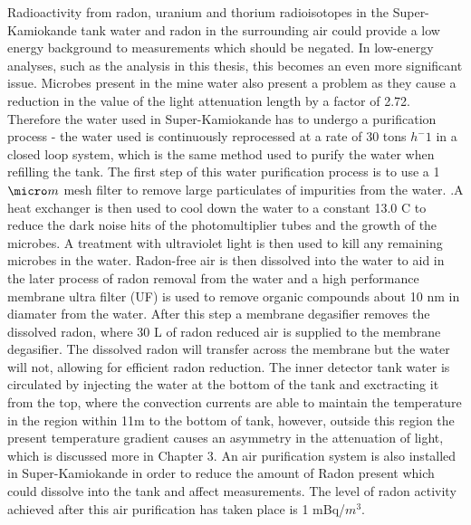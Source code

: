 Radioactivity from radon, uranium and thorium radioisotopes in the Super-Kamiokande tank water and radon in the surrounding air could provide a low energy background to measurements which should be negated. In low-energy analyses, such as the analysis in this thesis, this becomes an even more significant issue. Microbes present in the mine water also present a problem as they cause a reduction in the value of the light attenuation length by a factor of 2.72. Therefore the water used in Super-Kamiokande has to undergo a purification process - the water used is continuously reprocessed at a rate of 30 tons $h^-1$ in a closed loop system, which is the same method used to purify the water when refilling the tank. The first step of this water purification process is to use a 1$\micro m$ mesh filter to remove large particulates of impurities from the water. \cite{fernandezStatusGADZOOKSNeutron2016}.A heat exchanger is then used to cool down the water to a constant 13.0 \degree C to reduce the dark noise hits of the photomultiplier tubes and the growth of the microbes. A treatment with ultraviolet light is then used to kill any remaining microbes in the water. Radon-free air is then dissolved into the water to aid in the later process of radon removal from the water and a high performance membrane ultra filter (UF) is used to remove organic compounds about 10 nm in diamater from the water. After this step a membrane degasifier removes the dissolved radon, where 30 L of radon reduced air is supplied to the membrane degasifier. The dissolved radon will transfer across the membrane but the water will not, allowing for efficient radon reduction. The inner detector tank water is circulated by injecting the water at the bottom of the tank and exctracting it from the top, where the convection currents are able to maintain the temperature in the region within 11m to the bottom of tank, however, outside this region the present temperature gradient causes an asymmetry in the attenuation of light, which is discussed more in Chapter 3. 
\newline
 An air purification system is also installed in Super-Kamiokande in order to reduce the amount of Radon present which could dissolve into the tank and affect measurements. The level of radon activity achieved after this air purification has taken place is 1 mBq/$m^{3}$.

